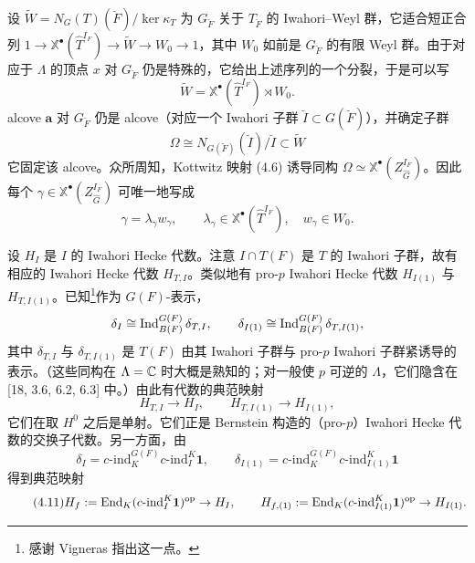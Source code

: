 设 $\widetilde W=N_G(T)(\breve F)/\ker\kappa_T$ 为 $G_{\breve F}$ 关于 $T_{\breve F}$ 的 Iwahori–Weyl 群，它适合短正合列 $1\to\mathbb{X}^\bullet(\hat T^{I_F})\to\widetilde W\to W_0\to1$，其中 $W_0$ 如前是 $G_{\breve F}$ 的有限 Weyl 群。由于对应于 $\Lambda$ 的顶点 $x$ 对 $G_{\breve F}$ 仍是特殊的，它给出上述序列的一个分裂，于是可以写
\begin{equation}
\tag{4.7}
\widetilde W=\mathbb{X}^\bullet(\hat T^{I_F})\rtimes W_0.
\end{equation}
alcove $\mathbf{a}$ 对 $G_{\breve F}$ 仍是 alcove（对应一个 Iwahori 子群 $\breve I\subset G(\breve F)$），并确定子群
\begin{equation}
\tag{4.8}
\Omega\cong N_{G(\breve F)}(\breve I)/\breve I\subset\widetilde W
\end{equation}
它固定该 alcove。众所周知，Kottwitz 映射 (4.6) 诱导同构 $\Omega\simeq\mathbb{X}^\bullet(Z_{\hat G}^{I_F})$。因此每个 $\gamma\in\mathbb{X}^\bullet(Z_{\hat G}^{I_F})$ 可唯一地写成
\begin{equation}
\tag{4.9}
\gamma=\lambda_\gamma w_\gamma,\qquad \lambda_\gamma\in\mathbb{X}^\bullet(\hat T^{I_F}),\quad w_\gamma\in W_0.
\end{equation}

设 $H_I$ 是 $I$ 的 Iwahori Hecke 代数。注意 $I\cap T(F)$ 是 $T$ 的 Iwahori 子群，故有相应的 Iwahori Hecke 代数 $H_{T,I}$。类似地有 pro-$p$ Iwahori Hecke 代数 $H_{I(1)}$ 与 $H_{T,I(1)}$。已知\footnote{感谢 Vigneras 指出这一点。}作为 $G(F)$-表示，
\[
\delta_I\cong\operatorname{Ind}_{B(F)}^{G(F)}\delta_{T,I},\qquad
\delta_{I(1)}\cong\operatorname{Ind}_{B(F)}^{G(F)}\delta_{T,I(1)},
\]
其中 $\delta_{T,I}$ 与 $\delta_{T,I(1)}$ 是 $T(F)$ 由其 Iwahori 子群与 pro-$p$ Iwahori 子群紧诱导的表示。（这些同构在 $\Lambda=\mathbb{C}$ 时大概是熟知的；对一般使 $p$ 可逆的 $\Lambda$，它们隐含在 [18, 3.6, 6.2, 6.3] 中。）由此有代数的典范映射
\begin{equation}
\tag{4.10}
H_{T,I}\to H_I,\qquad H_{T,I(1)}\to H_{I(1)},
\end{equation}
它们在取 $H^0$ 之后是单射。它们正是 Bernstein 构造的（pro-$p$）Iwahori Hecke 代数的交换子代数。另一方面，由
\[
\delta_I=c\text{-}\mathrm{ind}_K^{G(F)}c\text{-}\mathrm{ind}_I^K\mathbf{1},\qquad
\delta_{I(1)}=c\text{-}\mathrm{ind}_K^{G(F)}c\text{-}\mathrm{ind}_{I(1)}^K\mathbf{1}
\]
得到典范映射
\begin{equation}
\tag{4.11}
H_f:=\operatorname{End}_K(c\text{-}\mathrm{ind}_I^K\mathbf{1})^{\mathrm{op}}\to H_I,\qquad
H_{f,(1)}:=\operatorname{End}_K(c\text{-}\mathrm{ind}_{I(1)}^K\mathbf{1})^{\mathrm{op}}\to H_{I(1)}.
\end{equation}

